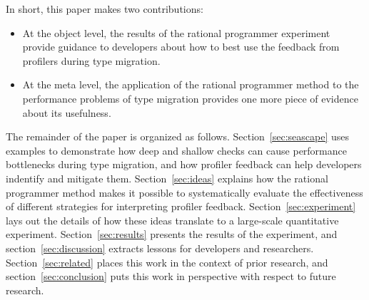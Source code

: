 In short, this paper makes two contributions:
\begin{itemize}

\item At the object level, the results of the rational programmer experiment
 provide guidance to developers about how to best use the feedback from
 profilers during type migration.

\item At the meta level, the application of the rational programmer method to
 the performance problems of type migration provides one more piece of evidence
 about its usefulness. 
    
\end{itemize}    
The remainder of the paper is organized as follows.  Section~\ref{sec:seascape}
uses examples to demonstrate how deep and shallow checks can cause performance
bottlenecks during type migration, and how profiler feedback can help developers
indentify and mitigate them.  Section~\ref{sec:ideas} explains how the rational
programmer method makes it possible to systematically evaluate the effectiveness
of different strategies for interpreting profiler
feedback. Section~\ref{sec:experiment} lays out the details of how these ideas
translate to a large-scale quantitative experiment.  Section~\ref{sec:results}
presents the results of the experiment, and section~\ref{sec:discussion}
extracts lessons for developers and researchers.  Section~\ref{sec:related}
places this work in the context of prior research, and
section~\ref{sec:conclusion} puts this work in perspective with respect to
future research.
